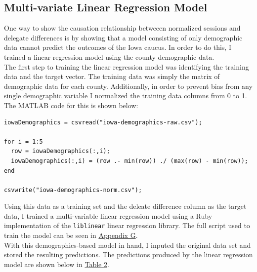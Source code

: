 \documentclass[11pt]{article}
\begin{document}
\begin{multicols}{2}

\subsection{Multi-variate Linear Regression Model}

One way to show the causation relationship betweeen normalized sessions and delegate differences is by showing that a model consisting of only demographic data cannot predict the outcomes of the Iowa caucus. In order to do this, I trained a linear regression model using the county demographic data. \\

The first step to training the linear regression model was identifying the training data and the target vector. The training data was simply the matrix of demographic data for each county. Additionally, in order to prevent bias from any single demographic variable I normalized the training data columns from 0 to 1. The MATLAB code for this is shown below: \\

\begin{lstlisting}
iowaDemographics = csvread("iowa-demographics-raw.csv");

for i = 1:5
  row = iowaDemographics(:,i);
  iowaDemographics(:,i) = (row .- min(row)) ./ (max(row) - min(row));
end

csvwrite("iowa-demographics-norm.csv");
\end{lstlisting}

Using this data as a training set and the deleate difference column as the target data, I trained a multi-variable linear regression model using a Ruby implementation of the \texttt{liblinear} linear regression library. The full script used to train the model can be seen in \underline{Appendix G}. \\

With this demographics-based model in hand, I inputed the original data set and stored the resulting predictions. The predictions produced by the linear regression model are shown below in \underline{Table 2}.

\end{multicols}
\end{document}
